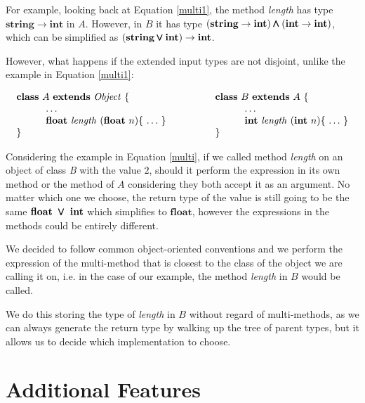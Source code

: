 \documentclass{l4proj}
\begin{document}
For example, looking back at Equation \ref{multi1}, the method \emph{length} has type $\mathbf{string} \rightarrow \mathbf{int}$ in $A$.
However, in $B$ it has type $(\textbf{string} \rightarrow \textbf{int}) \pmb{\wedge} (\textbf{int} \rightarrow \textbf{int})$,
which can be simplified as $(\textbf{string} \pmb{\vee} \textbf{int}) \rightarrow \textbf{int}$.

However, what happens if the extended input types are not disjoint, unlike the example in Equation \ref{multi1}:

\begin{equation}
    \label{multi}
    \begin{array}{ll}
        \syndecl{A}{\mathit{Object}} {
         &
            \qquad
            \syndecl{B}{A} {
                \\
                \qquad\quad \ldots \qquad
         &
                \qquad\qquad\quad \ldots \
                \\
                \qquad\quad \textbf{float}\ \mathit{length}\ (\textbf{float}\ n)\{\ \ldots\ \}\qquad
         &
                \qquad\qquad\quad \textbf{int}\ \mathit{length}\ (\textbf{int}\ n)\{\ \ldots\ \}
                \\
            }
         &
            \qquad }
    \end{array}
\end{equation}

Considering the example in Equation \ref{multi}, if we called method \emph{length} on an object of class \emph{B} with the value $2$, should it perform the expression in its own method or the method of $A$ considering they both accept it as an argument.
No matter which one we choose, the return type of the value is still going to be the same $\textbf{float}\ \pmb{\vee}\ \textbf{int}$ which simplifies to $\textbf{float}$, however the expressions in the methods could be entirely different.

We decided to follow common object-oriented conventions and we perform the expression of the multi-method that is closest to the class of the object we are calling it on, i.e. in the case of our example, the method \emph{length} in $B$ would be called.

We do this storing the type of \emph{length} in $B$ without regard of multi-methods, as we can always generate the return type by walking up the tree of parent types, but it allows us to decide which implementation to choose.

\section{Additional Features}
\end{document}
